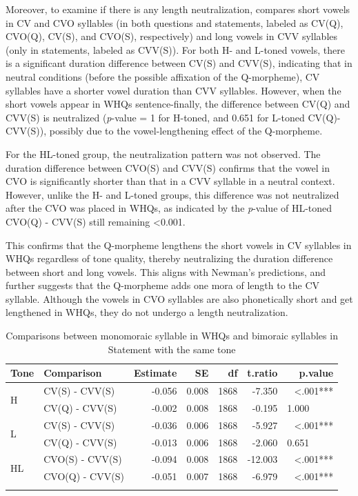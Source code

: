 \documentclass[output=paper,colorlinks,citecolor=brown
]{langscibook}
\begin{document}
Moreover, to examine if there is any length neutralization,  compares short vowels in CV and CVO syllables (in both questions and statements, labeled as CV(Q), CVO(Q), CV(S), and CVO(S), respectively) and long vowels in CVV syllables (only in statements, labeled as CVV(S)). For both H- and L-toned vowels, there is a significant duration difference between CV(S) and CVV(S), indicating that in neutral conditions (before the possible affixation of the Q-morpheme), CV syllables have a shorter vowel duration than CVV syllables. However, when the short vowels appear in WHQs sentence-finally, the difference between CV(Q) and CVV(S) is neutralized (\textit{p}-value = 1 for H-toned, and 0.651 for L-toned CV(Q)- CVV(S)), possibly due to the vowel-lengthening effect of the Q-morpheme.

For the HL-toned group, the neutralization pattern was not observed. The duration difference between CVO(S) and CVV(S) confirms that the vowel in CVO is significantly shorter than that in a CVV syllable in a neutral context. However, unlike the H- and L-toned groups, this difference was not neutralized after the CVO was placed in WHQs, as indicated by the \textit{p}-value of HL-toned CVO(Q) - CVV(S) still remaining <0.001.

This confirms that the Q-morpheme lengthens the short vowels in CV syllables in WHQs regardless of tone quality, thereby neutralizing the duration difference between short and long vowels. This aligns with Newman's predictions, and further suggests that the Q-morpheme adds one mora of length to the CV syllable. Although the vowels in CVO syllables are also phonetically short and get lengthened in WHQs, they do not undergo a length neutralization.
 
\begin{table}
\begin{tabular}{llrrrrr}
    \lsptoprule
    Tone & Comparison & Estimate & SE & df & t.ratio & p.value \\ \midrule
    \multirow{2}{*}{H} & CV(S) - CVV(S) & -0.056 & 0.008 & 1868 & -7.350 & <.001*** \\
                       & CV(Q) - CVV(S) & -0.002 & 0.008 & 1868 & -0.195 & 1.000~~~~~ \\ \midrule
    \multirow{2}{*}{L} & CV(S) - CVV(S) & -0.036 & 0.006 & 1868 & -5.927 & <.001*** \\
                       & CV(Q) - CVV(S) & -0.013 & 0.006 & 1868 & -2.060 & 0.651~~~~~ \\ \midrule
    \multirow{2}{*}{HL} & CVO(S) - CVV(S) & -0.094 & 0.008 & 1868 & -12.003 & <.001*** \\
                    & CVO(Q) - CVV(S) & -0.051 & 0.007 & 1868 & -6.979 & <.001*** \\\lspbottomrule

\end{tabular}
    \caption{Comparisons between monomoraic syllable in WHQs and bimoraic syllables in Statement with the same tone}
    \label{tab:Li:durneutral}
\end{table}
\end{document}

